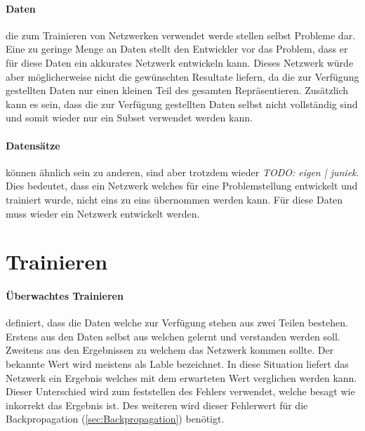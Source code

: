 
\paragraph{Daten} die zum Trainieren von Netzwerken verwendet werde stellen selbst Probleme dar.
Eine zu geringe Menge an Daten stellt den Entwickler vor das Problem, dass er für diese Daten ein akkurates Netzwerk entwickeln kann.
Dieses Netzwerk würde aber möglicherweise nicht die gewünschten Resultate liefern, da die zur Verfügung gestellten Daten nur einen kleinen Teil des gesamten Repräsentieren.
Zusätzlich kann es sein, dass die zur Verfügung gestellten Daten selbst nicht vollständig sind und somit wieder nur ein Subset verwendet werden kann.

\paragraph{Datensätze} können ähnlich sein zu anderen, sind aber trotzdem wieder \textit{TODO: eigen | juniek}.
Dies bedeutet, dass ein Netzwerk welches für eine Problemstellung entwickelt und trainiert wurde, nicht eins zu eins übernommen werden kann.
Für diese Daten muss wieder ein Netzwerk entwickelt werden.

\section{Trainieren}

\paragraph{Überwachtes Trainieren} definiert, dass die Daten welche zur Verfügung stehen aus zwei Teilen bestehen.
Erstens aus den Daten selbst aus welchen gelernt und verstanden werden soll.
Zweitens aus den Ergebnissen zu welchem das Netzwerk kommen sollte.
Der bekannte Wert wird meistens als Lable bezeichnet. 
In diese Situation liefert das Netzwerk ein Ergebnis welches mit dem erwarteten Wert verglichen werden kann.
Dieser Unterschied wird zum feststellen des Fehlers verwendet, welche besagt wie inkorrekt das Ergebnis ist.
Des weiteren wird dieser Fehlerwert für die Backpropagation (\ref{sec:Backpropagation}) benötigt.

